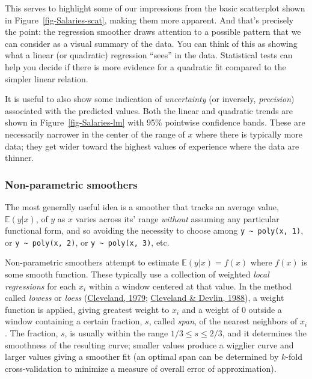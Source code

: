 \documentclass[
  letterpaper,
  10pt,
  krantz2]{krantz}
\begin{document}
This serves to highlight some of our impressions from the basic
scatterplot shown in Figure~\ref{fig-Salaries-scat}, making them more
apparent. And that's precisely the point: the regression smoother draws
attention to a possible pattern that we can consider as a visual summary
of the data. You can think of this as showing what a linear (or
quadratic) regression ``sees'' in the data. Statistical tests can help
you decide if there is more evidence for a quadratic fit compared to the
simpler linear relation.

It is useful to also show some indication of \emph{uncertainty} (or
inversely, \emph{precision}) associated with the predicted values. Both
the linear and quadratic trends are shown in
Figure~\ref{fig-Salaries-lm} with 95\% pointwise confidence bands. These
are necessarily narrower in the center of the range of \(x\) where there
is typically more data; they get wider toward the highest values of
experience where the data are thinner.

\hypertarget{non-parametric-smoothers}{%
\subsubsection{Non-parametric
smoothers}\label{non-parametric-smoothers}}

The most generally useful idea is a smoother that tracks an average
value, \(\mathbb{E} (y | x)\), of \(y\) as \(x\) varies across its'
range \emph{without} assuming any particular functional form, and so
avoiding the necessity to choose among
\texttt{y\ \textasciitilde{}\ poly(x,\ 1)}, or
\texttt{y\ \textasciitilde{}\ poly(x,\ 2)}, or
\texttt{y\ \textasciitilde{}\ poly(x,\ 3)}, etc.

Non-parametric smoothers attempt to estimate
\(\mathbb{E} (y | x) = f(x)\) where \(f(x)\) is some smooth function.
These typically use a collection of weighted \emph{local regressions}
for each \(x_i\) within a window centered at that value. In the method
called \emph{lowess} or \emph{loess}
(\protect\hyperlink{ref-Cleveland:79}{Cleveland, 1979};
\protect\hyperlink{ref-ClevelandDevlin:88}{Cleveland \& Devlin, 1988}),
a weight function is applied, giving greatest weight to \(x_i\) and a
weight of 0 outside a window containing a certain fraction, \(s\),
called \emph{span}, of the nearest neighbors of \(x_i\). The fraction,
\(s\), is usually within the range \(1/3 \le s \le 2/3\), and it
determines the smoothness of the resulting curve; smaller values produce
a wigglier curve and larger values giving a smoother fit (an optimal
span can be determined by \(k\)-fold cross-validation to minimize a
measure of overall error of approximation).
\end{document}
